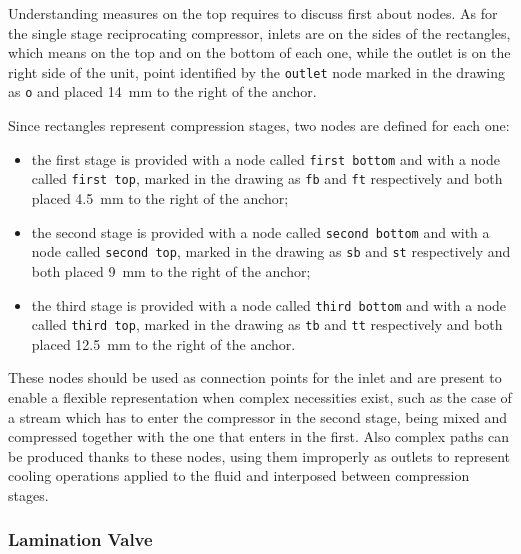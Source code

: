 \documentclass[12pt]{article}						%
\newcommand*{\chpn}[1]{\texttt{#1}}				%
\begin{document}
Understanding measures on the top requires to discuss first about nodes. As for
the single stage reciprocating compressor, inlets are on the sides of the
rectangles, which means on the top and on the bottom of each one, while the
outlet is on the right side of the unit, point identified by the \chpn{outlet}
node marked in the drawing as \chpn{o} and placed \SI{14}{\mm} to the right of
the anchor.

Since rectangles represent compression stages, two nodes are defined for each
one:
\begin{itemize}
	\item the first stage is provided with a node called \chpn{first bottom} and
		with a node called \chpn{first top}, marked in the drawing as \chpn{fb}
		and \chpn{ft} respectively and both placed \SI{4.5}{\mm} to the right
		of the anchor;
	\item the second stage is provided with a node called \chpn{second bottom}
		and with a node called \chpn{second top}, marked in the drawing as
		\chpn{sb} and \chpn{st} respectively and both placed \SI{9}{\mm} to the
		right of the anchor;
	\item the third stage is provided with a node called \chpn{third bottom} and
		with a node called \chpn{third top}, marked in the drawing as \chpn{tb}
		and \chpn{tt} respectively and both placed \SI{12.5}{\mm} to the right
		of the anchor.
\end{itemize}
These nodes should be used as connection points for the inlet and are present to
enable a flexible representation when complex necessities exist, such as the
case of a stream which has to enter the compressor in the second stage, being
mixed and compressed together with the one that enters in the first. Also
complex paths can be produced thanks to these nodes, using them improperly as
outlets to represent cooling operations applied to the fluid and interposed
between compression stages.

\subsubsection{Lamination Valve}
\end{document}

